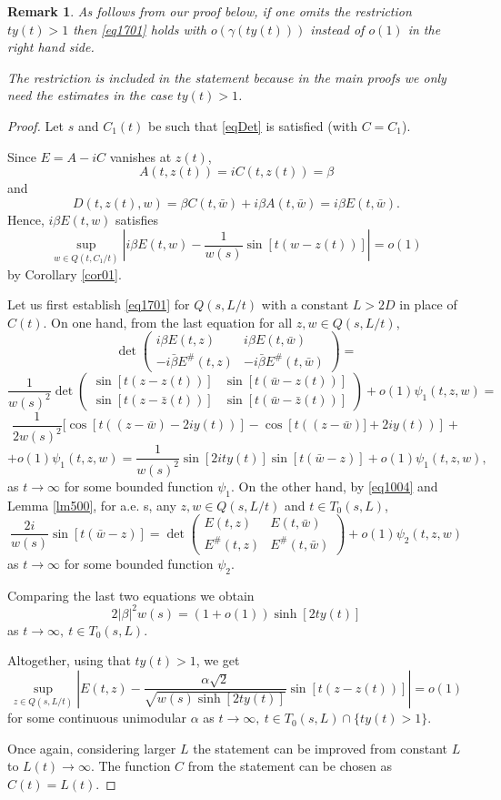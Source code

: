 \documentclass[11pt,twoside,reqno]{amsart}
\def\to{\rightarrow}
\def\g{\gamma}
\def\a{\alpha}
\def\b{\beta}
\theoremstyle{plain}
\newtheorem{remark}{Remark}
\numberwithin{equation}{section}
\begin{document}
\begin{remark}\label{rem007}
As follows from our proof below, if one omits the restriction  $ty(t)>1$ then \eqref{eq1701} holds with
$o(\g(ty(t)))$ instead of $o(1)$ in the right hand side.

The restriction is included in the statement because in the main proofs we
only need the estimates in the case  $ty(t)>1$.

\end{remark}

\begin{proof}
Let $s$ and $C_1(t)$ be such that \eqref{eqDet} is satisfied (with $C=C_1$).

Since $E=A-iC$ vanishes at $z(t)$,
$$A(t,z(t))=iC(t,z(t))=\b$$ and $$D(t,z(t),w)=\b C(t,\bar w)+i\b A(t,\bar w)=i\b E(t,\bar w).$$
Hence, $i\b E(t, w)$ satisfies
$$\sup_{w\in Q(t,C_1/t)}\left|i\b E( t,w)-\frac{1}{w(s)}\sin [t(w-z(t))]\right|=o(1)$$   by Corollary \ref{cor01}.


Let us first establish \eqref{eq1701} for $Q(s,L/t)$ with a constant $L>2D$ in place of $C(t)$.
On one hand, from the last equation for all  $z,w\in Q(s,L/t)$,
$$\det\begin{pmatrix}i\b E(t,z) & i\b E(t,\bar w) \\ -i\bar\b E^\#(t,z) & -i\bar\b E^\# (t,\bar w)
\end{pmatrix}=
$$
$$\frac 1{w(s)^2}\det\begin{pmatrix}  \sin [t(z-z(t))] &  \sin [t(\bar w-z(t))] \\  \sin [t(z-\bar z(t))] &  \sin [t(\bar w-\bar z(t))]\end{pmatrix}+o(1)\psi_1(t,z,w)=
$$
$$ \frac 1{2w(s)^2} [\cos [t((z-\bar w)-2iy(t))] -\cos [t((z-\bar w)]+2iy(t))]+$$
\begin{equation} +o(1)\psi_1(t,z,w)=\frac 1{w(s)^2}\sin [2ity(t)] \sin [t(\bar w -z)]+o(1)\psi_1(t,z,w),\label{eq00a}\end{equation}
as $t\to\infty$ for some bounded function $\psi_1$. On the other hand,  by \eqref{eq1004} and Lemma \ref{lm500}, for  a.e. s, any $z,w\in Q(s,L/t)$
and $t\in T_0(s,L)$,
$$\frac{2i}{w(s)}\sin [t(\bar w -z)]=\det\begin{pmatrix} E(t,z) &  E(t,\bar w) \\  E^\#(t,z) &  E^\# (t,\bar w)
\end{pmatrix}+o(1)\psi_2(t,z,w)
$$
as $t\to\infty$ for some bounded function $\psi_2$.

Comparing the last two equations we obtain
$$2|\b|^2w(s)=(1+o(1))\sinh [2ty(t)]$$
as $t\to\infty,\ t\in T_0(s,L)$.



Altogether, using that $ty(t)>1$, we get
$$\sup_{z\in Q(s,L/t)}\left|E(t,z)-\frac {\a\sqrt{ 2}}{\sqrt{w(s)\sinh [2ty(t)]}}\sin [t(z-z(t))]\right|=o(1)
$$
 for some continuous unimodular  $\a$ as $t\to\infty,\ t\in T_0(s,L)\cap \{ty(t)>1\}$.



Once again, considering larger $L$ the statement can be improved from constant $L$ to $L(t)\to\infty$.
The function $C$ from the statement can be chosen as $C(t)=L(t)$.


\end{proof}
\end{document}
